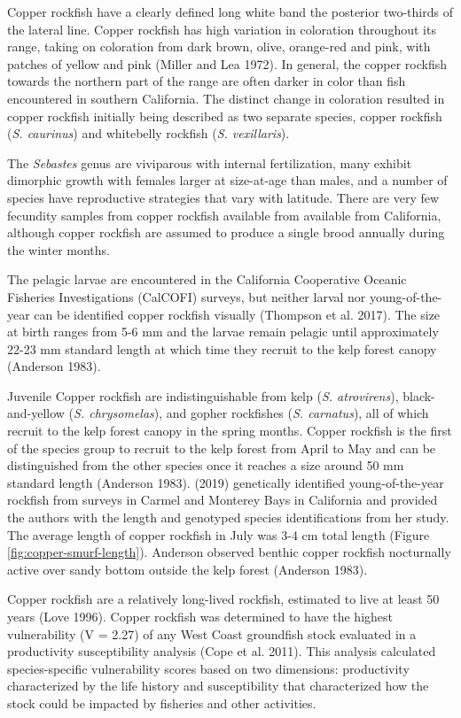 \documentclass[11pt,
  english,
  letterpaper,
]{article}
\begin{document}
Copper rockfish have a clearly defined long white band the posterior two-thirds of the lateral line. Copper rockfish has high variation in coloration throughout its range, taking on coloration from dark brown, olive, orange-red and pink, with patches of yellow and pink (Miller and Lea 1972). In general, the copper rockfish towards the northern part of the range are often darker in color than fish encountered in southern California. The distinct change in coloration resulted in copper rockfish initially being described as two separate species, copper rockfish (\emph{S. caurinus}) and whitebelly rockfish (\emph{S. vexillaris}).

The \emph{Sebastes} genus are viviparous with internal fertilization, many exhibit dimorphic growth with females larger at size-at-age than males, and a number of species have reproductive strategies that vary with latitude. There are very few fecundity samples from copper rockfish available from available from California, although copper rockfish are assumed to produce a single brood annually during the winter months.

The pelagic larvae are encountered in the California Cooperative Oceanic Fisheries Investigations (CalCOFI) surveys, but neither larval nor young-of-the-year can be identified copper rockfish visually (Thompson et al. 2017). The size at birth ranges from 5-6 mm and the larvae remain pelagic until approximately 22-23 mm standard length at which time they recruit to the kelp forest canopy (Anderson 1983).

Juvenile Copper rockfish are indistinguishable from kelp (\emph{S. atrovirens}), black-and-yellow (\emph{S. chrysomelas}), and gopher rockfishes (\emph{S. carnatus}), all of which recruit to the kelp forest canopy in the spring months. Copper rockfish is the first of the species group to recruit to the kelp forest from April to May and can be distinguished from the other species once it reaches a size around 50 mm standard length (Anderson 1983). (2019) genetically identified young-of-the-year rockfish from surveys in Carmel and Monterey Bays in California and provided the authors with the length and genotyped species identifications from her study. The average length of copper rockfish in July was 3-4 cm total length (Figure \ref{fig:copper-smurf-length}). Anderson observed benthic copper rockfish nocturnally active over sandy bottom outside the kelp forest (Anderson 1983).

Copper rockfish are a relatively long-lived rockfish, estimated to live at least 50 years (Love 1996). Copper rockfish was determined to have the highest vulnerability (V = 2.27) of any West Coast groundfish stock evaluated in a productivity susceptibility analysis (Cope et al. 2011). This analysis calculated species-specific vulnerability scores based on two dimensions: productivity characterized by the life history and susceptibility that characterized how the stock could be impacted by fisheries and other activities.
\end{document}
